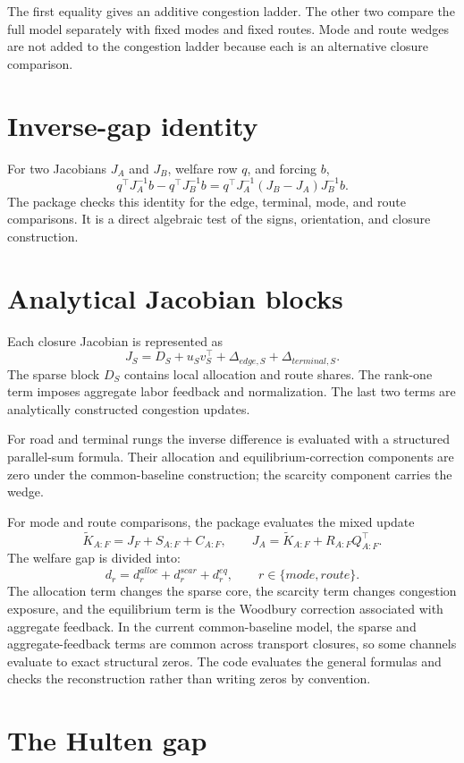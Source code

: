 The first equality gives an additive congestion ladder. The other two compare
the full model separately with fixed modes and fixed routes. Mode and route
wedges are not added to the congestion ladder because each is an alternative
closure comparison.

\section{Inverse-gap identity}

For two Jacobians \(J_A\) and \(J_B\), welfare row \(q\), and forcing \(b\),
\[
 q^\top J_A^{-1}b-q^\top J_B^{-1}b
 =q^\top J_A^{-1}(J_B-J_A)J_B^{-1}b.
\]
The package checks this identity for the edge, terminal, mode, and route
comparisons. It is a direct algebraic test of the signs, orientation, and
closure construction.

\section{Analytical Jacobian blocks}

Each closure Jacobian is represented as
\[
 J_S=D_S+u_Sv_S^\top
     +\Delta_{edge,S}
     +\Delta_{terminal,S}.
\]
The sparse block \(D_S\) contains local allocation and route shares. The
rank-one term imposes aggregate labor feedback and normalization. The last
two terms are analytically constructed congestion updates.

For road and terminal rungs the inverse difference is evaluated with a
structured parallel-sum formula. Their allocation and equilibrium-correction
components are zero under the common-baseline construction; the scarcity
component carries the wedge.

For mode and route comparisons, the package evaluates the mixed update
\[
 \widetilde K_{A:F}=J_F+S_{A:F}+C_{A:F},
 \qquad
 J_A=\widetilde K_{A:F}+R_{A:F}Q_{A:F}^\top.
\]
The welfare gap is divided into:
\[
 d_r=d_r^{alloc}+d_r^{scar}+d_r^{eq},
 \qquad r\in\{mode,route\}.
\]
The allocation term changes the sparse core, the scarcity term changes
congestion exposure, and the equilibrium term is the Woodbury correction
associated with aggregate feedback. In the current common-baseline model, the
sparse and aggregate-feedback terms are common across transport closures, so
some channels evaluate to exact structural zeros. The code evaluates the
general formulas and checks the reconstruction rather than writing zeros by
convention.

\section{The Hulten gap}

